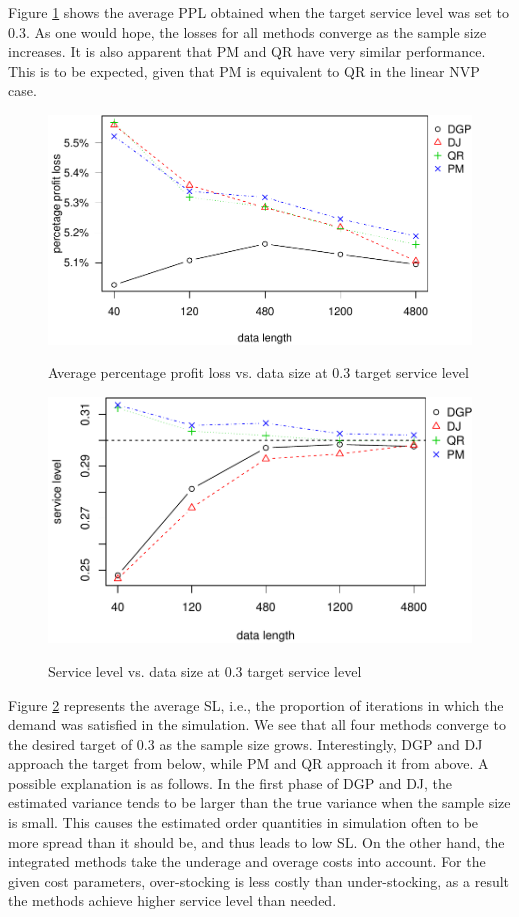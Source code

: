 \documentclass{article}
\begin{document}
 Figure \ref{fig:ppl0.3} shows the average PPL obtained when the target service level was set to $0.3$. As one would hope, the losses for all methods converge as the sample size increases. It is also apparent that PM and QR have very similar performance. This is to be expected, given that PM is equivalent to QR in the linear NVP case.

\begin{figure}
\centering
\caption{Average percentage profit loss vs. data size at 0.3 target service level}
\includegraphics{linear-norm-plot_files/figure-latex/ppl0.3-1.pdf}
\label{fig:ppl0.3}
\end{figure}

\begin{figure}[ht]
\centering
\caption{Service level vs. data size at 0.3 target service level}
\includegraphics{linear-norm-plot_files/figure-latex/sl-3.pdf}
\label{fig:sl0.3}
\end{figure}

Figure \ref{fig:sl0.3} represents the average SL, i.e., the proportion of iterations in which the demand was satisfied in the simulation.
We see that all four methods converge to the desired target of 0.3 as the sample size grows. Interestingly, DGP and DJ approach the target from below, while PM and QR approach it from above. A possible explanation is as follows. In the first phase of DGP and DJ, the estimated variance tends to be larger than the true variance when the sample size is small. This causes the estimated order quantities in simulation often to be more spread than it should be, and thus leads to low SL. On the other hand, the integrated methods take the underage and overage costs into account. For the given cost parameters, over-stocking is less costly than under-stocking, as a result the methods achieve higher service level than needed.
\end{document}
